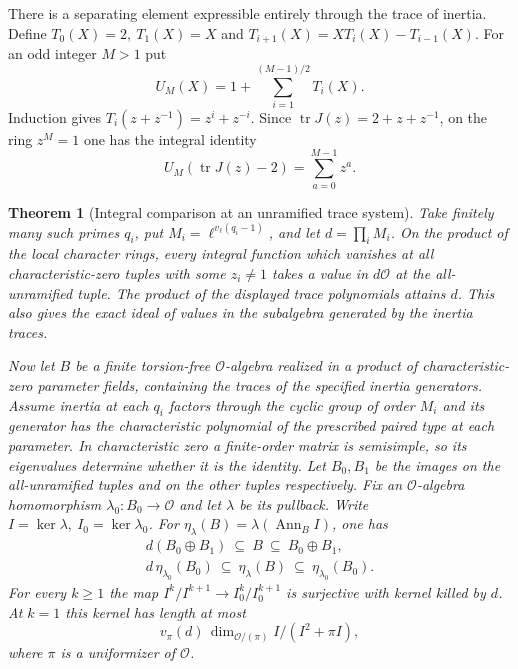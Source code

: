 \documentclass[a4paper,11pt]{article}
\newtheorem{theorem}[proposition]{Theorem}
\theoremstyle{definition}
\theoremstyle{remark}
\numberwithin{equation}{section}
\begin{document}
There is a separating element expressible entirely through
the trace of inertia. Define \(T_0(X)=2,\ T_1(X)=X\) and
\(T_{i+1}(X)=XT_i(X)-T_{i-1}(X)\). For an odd integer \(M>1\)
put
\[
                 U_M(X)=1+\sum_{i=1}^{(M-1)/2}T_i(X).
\]
Induction gives \(T_i(z+z^{-1})=z^i+z^{-i}\). Since
\(\operatorname{tr}J(z)=2+z+z^{-1}\), on the ring \(z^M=1\)
one has the integral identity
\[
     U_M(\operatorname{tr}J(z)-2)=\sum_{a=0}^{M-1}z^a .
\]

\begin{theorem}[Integral comparison at an unramified trace system]
\leavevmode\label{thm:pairedtrace651}
Take finitely many such primes \(q_i\), put
\(M_i=\ell^{v_\ell(q_i-1)}\), and let \(d=\prod_i M_i\).
On the product of the local character rings, every integral
function which vanishes at all characteristic-zero tuples with
some \(z_i\ne1\) takes a value in \(d\mathcal O\) at the
all-unramified tuple. The product of the displayed trace
polynomials attains \(d\). This also gives the exact ideal of
values in the subalgebra generated by the inertia traces.

Now let \(B\) be a finite torsion-free \(\mathcal O\)-algebra
realized in a product of characteristic-zero parameter fields,
containing the traces of the specified inertia generators.
Assume inertia at each \(q_i\) factors through the cyclic group
of order \(M_i\) and its generator has the characteristic
polynomial of the prescribed paired type at each parameter.
In characteristic zero a finite-order matrix is semisimple,
so its eigenvalues determine whether it is the identity.
Let \(B_0,B_1\) be the images on the all-unramified tuples
and on the other tuples respectively.
Fix an \(\mathcal O\)-algebra homomorphism
\(\lambda_0:B_0\to\mathcal O\) and let \(\lambda\) be its pullback.
Write \(I=\ker\lambda,\ I_0=\ker\lambda_0\). For
\(\eta_\lambda(B)=\lambda(\operatorname{Ann}_B I)\), one has
\[
 \begin{gathered}
    d(B_0\oplus B_1)\ \subseteq\ B\ \subseteq\ B_0\oplus B_1,\\
    d\,\eta_{\lambda_0}(B_0)\ \subseteq\ \eta_\lambda(B)
                         \ \subseteq\ \eta_{\lambda_0}(B_0).
 \end{gathered}
\]
For every \(k\ge1\) the map
\(I^k/I^{k+1}\longrightarrow I_0^k/I_0^{k+1}\) is surjective
with kernel killed by \(d\). At \(k=1\) this kernel has length
at most
\[
     v_\pi(d)\,\dim_{\mathcal O/(\pi)} I/(I^2+\pi I),
\]
where \(\pi\) is a uniformizer of \(\mathcal O\).
\end{theorem}
\end{document}
